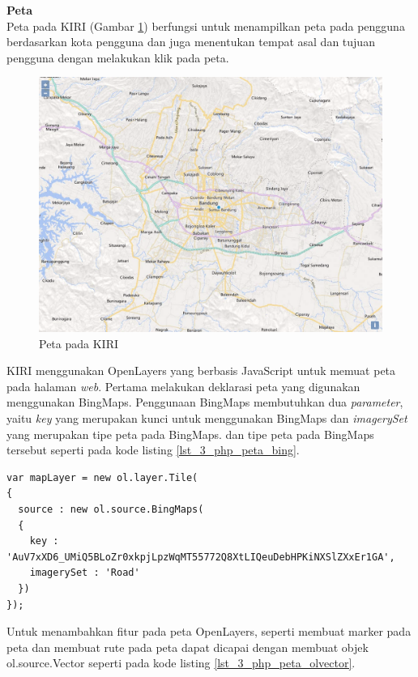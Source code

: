 \documentclass[a4paper,twoside]{article}
\begin{document}
\begin{enumerate}
\textbf{Peta}\\
Peta pada KIRI (Gambar \ref{fig:3_KIRI_peta}) berfungsi untuk menampilkan peta pada pengguna berdasarkan kota pengguna dan juga menentukan tempat asal dan tujuan pengguna dengan melakukan klik pada peta.

\begin{figure}[H]
  \centering
  \includegraphics[scale=0.4]{Gambar/KIRI-peta}
  \caption{Peta pada KIRI} 
  \label{fig:3_KIRI_peta}
\end{figure}

KIRI menggunakan OpenLayers yang berbasis JavaScript untuk memuat peta pada halaman \textit{web}. Pertama melakukan deklarasi peta yang digunakan menggunakan BingMaps. Penggunaan BingMaps membutuhkan dua \textit{parameter}, yaitu \textit{key} yang merupakan kunci untuk menggunakan BingMaps dan \textit{imagerySet} yang merupakan tipe peta pada BingMaps. dan tipe peta pada BingMaps tersebut seperti pada kode listing \ref{lst_3_php_peta_bing}.

\begin{lstlisting}[caption=Deklarasi peta BingMaps,label = {lst_3_php_peta_bing}]
var mapLayer = new ol.layer.Tile(
{
  source : new ol.source.BingMaps(
  {
    key : 'AuV7xXD6_UMiQ5BLoZr0xkpjLpzWqMT55772Q8XtLIQeuDebHPKiNXSlZXxEr1GA',
    imagerySet : 'Road'
  })
});
\end{lstlisting}


Untuk menambahkan fitur pada peta OpenLayers, seperti membuat marker pada peta dan membuat rute pada peta dapat dicapai dengan membuat objek ol.source.Vector seperti pada kode listing \ref{lst_3_php_peta_olvector}.


\end{enumerate}
\end{document}
